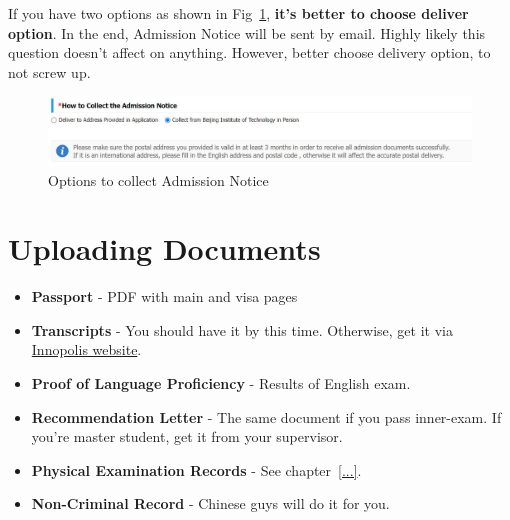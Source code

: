 If you have two options as shown in Fig~\ref{fig:ru_collect_adm_not},
\textbf{it's better to choose deliver option}.
In the end, Admission Notice will be sent by email.
Highly likely this question doesn't affect on anything.
However, better choose delivery option, to not screw up.


\begin{figure}[H]
    \centering
    \includegraphics[width=\textwidth]{russia/imgs/app_adm_notice}
    \caption{\centering Options to collect Admission Notice}
    \label{fig:ru_collect_adm_not}
\end{figure}






\section{Uploading Documents}\label{sec:ru_upload_docs}

\begin{itemize}
    \item \textbf{Passport} - PDF with main and visa pages

    \item \textbf{Transcripts} - You should have it by this time.
        Otherwise, get it via
    \href{https://my.university.innopolis.ru/profile/edu-certs/create}{Innopolis website}.

    \item \textbf{Proof of Language Proficiency} - Results of English exam.

    \item \textbf{Recommendation Letter} - The same document if you pass inner-exam.
    If you're master student, get it from your supervisor.

    \item \textbf{Physical Examination Records} - See chapter~\ref{...}.

    \item \textbf{Non-Criminal Record} - Chinese guys will do it for you.
\end{itemize}